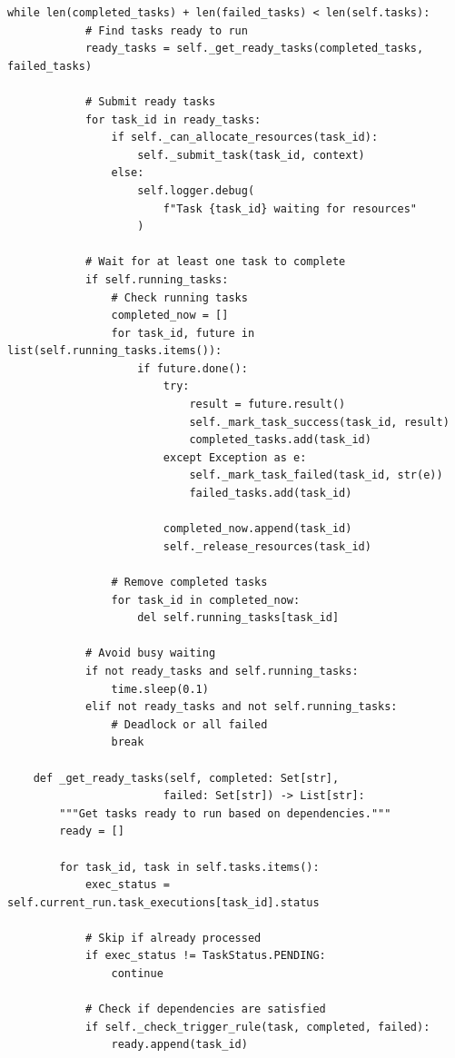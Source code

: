 \begin{lstlisting}[style=python, caption=PipelineOrchestrator with Dependency Management]
        while len(completed_tasks) + len(failed_tasks) < len(self.tasks):
            # Find tasks ready to run
            ready_tasks = self._get_ready_tasks(completed_tasks, failed_tasks)

            # Submit ready tasks
            for task_id in ready_tasks:
                if self._can_allocate_resources(task_id):
                    self._submit_task(task_id, context)
                else:
                    self.logger.debug(
                        f"Task {task_id} waiting for resources"
                    )

            # Wait for at least one task to complete
            if self.running_tasks:
                # Check running tasks
                completed_now = []
                for task_id, future in list(self.running_tasks.items()):
                    if future.done():
                        try:
                            result = future.result()
                            self._mark_task_success(task_id, result)
                            completed_tasks.add(task_id)
                        except Exception as e:
                            self._mark_task_failed(task_id, str(e))
                            failed_tasks.add(task_id)

                        completed_now.append(task_id)
                        self._release_resources(task_id)

                # Remove completed tasks
                for task_id in completed_now:
                    del self.running_tasks[task_id]

            # Avoid busy waiting
            if not ready_tasks and self.running_tasks:
                time.sleep(0.1)
            elif not ready_tasks and not self.running_tasks:
                # Deadlock or all failed
                break

    def _get_ready_tasks(self, completed: Set[str],
                        failed: Set[str]) -> List[str]:
        """Get tasks ready to run based on dependencies."""
        ready = []

        for task_id, task in self.tasks.items():
            exec_status = self.current_run.task_executions[task_id].status

            # Skip if already processed
            if exec_status != TaskStatus.PENDING:
                continue

            # Check if dependencies are satisfied
            if self._check_trigger_rule(task, completed, failed):
                ready.append(task_id)


\end{lstlisting}
